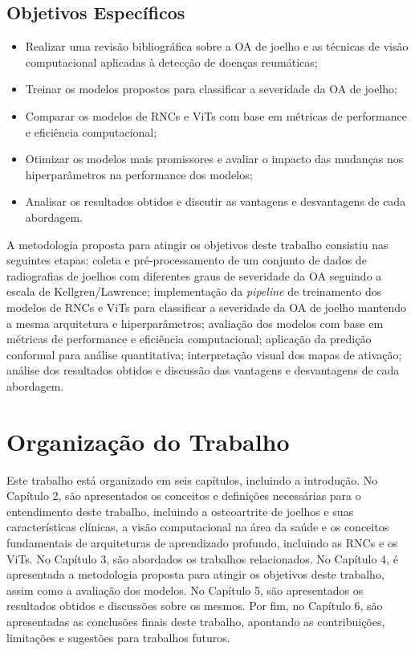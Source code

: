 \subsection{Objetivos Específicos}

\begin{itemize}
    \item Realizar uma revisão bibliográfica sobre a OA de joelho e as técnicas de visão computacional aplicadas à detecção de doenças reumáticas;
    \item Treinar os modelos propostos para classificar a severidade da OA de joelho;
    \item Comparar os modelos de RNCs e ViTs com base em métricas de performance e eficiência computacional;
    \item Otimizar os modelos mais promissores e avaliar o impacto das mudanças nos hiperparâmetros na performance dos modelos;
    \item Analisar os resultados obtidos e discutir as vantagens e desvantagens de cada abordagem.
\end{itemize}

A metodologia proposta para atingir os objetivos deste trabalho consistiu nas seguintes etapas: coleta e pré-processamento de um conjunto de dados de radiografias de joelhos com diferentes graus de severidade da OA seguindo a escala de Kellgren/Lawrence; implementação da \textit{pipeline} de treinamento dos modelos de RNCs e ViTs para classificar a severidade da OA de joelho mantendo a mesma arquitetura e hiperparâmetros; avaliação dos modelos com base em métricas de performance e eficiência computacional; aplicação da predição conformal para análise quantitativa; interpretação visual dos mapas de ativação; análise dos resultados obtidos e discussão das vantagens e desvantagens de cada abordagem.

\section{Organização do Trabalho}

Este trabalho está organizado em seis capítulos, incluindo a introdução. No Capítulo 2, são apresentados os conceitos e definições necessárias para o entendimento deste trabalho, incluindo a osteoartrite de joelhos e suas características clínicas, a visão computacional na área da saúde e os conceitos fundamentais de arquiteturas de aprendizado profundo, incluindo as RNCs e os ViTs. No Capítulo 3, são abordados os trabalhos relacionados. No Capítulo 4, é apresentada a metodologia proposta para atingir os objetivos deste trabalho, assim como a avaliação dos modelos. No Capítulo 5, são apresentados os resultados obtidos e discussões sobre os mesmos. Por fim, no Capítulo 6, são apresentadas as conclusões finais deste trabalho, apontando as contribuições, limitações e sugestões para trabalhos futuros.